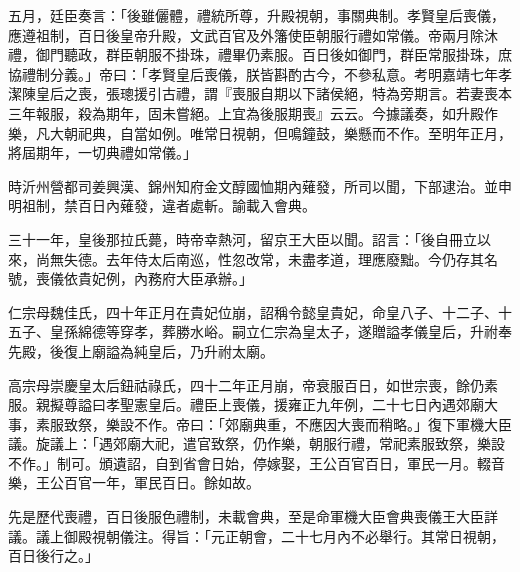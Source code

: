 \begin{pinyinscope}
五月，廷臣奏言：「後雖儷體，禮統所尊，升殿視朝，事關典制。孝賢皇后喪儀，應遵祖制，百日後皇帝升殿，文武百官及外籓使臣朝服行禮如常儀。帝兩月除沐禮，御門聽政，群臣朝服不掛珠，禮畢仍素服。百日後如御門，群臣常服掛珠，庶協禮制分義。」帝曰：「孝賢皇后喪儀，朕皆斟酌古今，不參私意。考明嘉靖七年孝潔陳皇后之喪，張璁援引古禮，謂『喪服自期以下諸侯絕，特為旁期言。若妻喪本三年報服，殺為期年，固未嘗絕。上宜為後服期喪』云云。今據議奏，如升殿作樂，凡大朝祀典，自當如例。唯常日視朝，但鳴鐘鼓，樂懸而不作。至明年正月，將屆期年，一切典禮如常儀。」

時沂州營都司姜興漢、錦州知府金文醇國恤期內薙發，所司以聞，下部逮治。並申明祖制，禁百日內薙發，違者處斬。諭載入會典。

三十一年，皇後那拉氏薨，時帝幸熱河，留京王大臣以聞。詔言：「後自冊立以來，尚無失德。去年侍太后南巡，性忽改常，未盡孝道，理應廢黜。今仍存其名號，喪儀依貴妃例，內務府大臣承辦。」

仁宗母魏佳氏，四十年正月在貴妃位崩，詔稱令懿皇貴妃，命皇八子、十二子、十五子、皇孫綿德等穿孝，葬勝水峪。嗣立仁宗為皇太子，遂贈謚孝儀皇后，升祔奉先殿，後復上廟謚為純皇后，乃升祔太廟。

高宗母崇慶皇太后鈕祜祿氏，四十二年正月崩，帝衰服百日，如世宗喪，餘仍素服。親擬尊謚曰孝聖憲皇后。禮臣上喪儀，援雍正九年例，二十七日內遇郊廟大事，素服致祭，樂設不作。帝曰：「郊廟典重，不應因大喪而稍略。」復下軍機大臣議。旋議上：「遇郊廟大祀，遣官致祭，仍作樂，朝服行禮，常祀素服致祭，樂設不作。」制可。頒遺詔，自到省會日始，停嫁娶，王公百官百日，軍民一月。輟音樂，王公百官一年，軍民百日。餘如故。

先是歷代喪禮，百日後服色禮制，未載會典，至是命軍機大臣會典喪儀王大臣詳議。議上御殿視朝儀注。得旨：「元正朝會，二十七月內不必舉行。其常日視朝，百日後行之。」


\end{pinyinscope}
